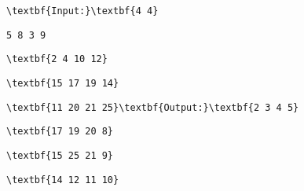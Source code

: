 \begin{verbatim}
\textbf{Input:}\textbf{4 4}\end{verbatim}
\begin{verbatim}
5 8 3 9\end{verbatim}
\begin{verbatim}
\textbf{2 4 10 12}\end{verbatim}
\begin{verbatim}
\textbf{15 17 19 14}\end{verbatim}
\begin{verbatim}
\textbf{11 20 21 25}\textbf{Output:}\textbf{2 3 4 5}\end{verbatim}
\begin{verbatim}
\textbf{17 19 20 8}\end{verbatim}
\begin{verbatim}
\textbf{15 25 21 9}\end{verbatim}
\begin{verbatim}
\textbf{14 12 11 10}\end{verbatim}